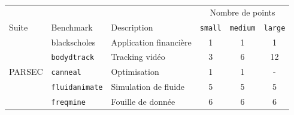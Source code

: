 \newcommand{\nothing}{-}
\begin{table}[h!]
\renewcommand{\arraystretch}{1.3}
	\begin{tabular}{l l l c c c}
\toprule
& & & \multicolumn{3}{c}{Nombre de points} \\
Suite & Benchmark & Description & \texttt{small} & \texttt{medium} & \texttt{large} \\
\midrule
\multirow{7}{*}{\textsc{PARSEC}} & blackscholes & Application financière & 1 & 1 & 1 \\
& \texttt{bodydtrack} & Tracking vidéo & 3 & 6 & 12 \\
& \texttt{canneal} & Optimisation & 1 & 1 & \nothing \\
& \texttt{fluidanimate} & Simulation de fluide & 5 & 5 & 5 \\
& \texttt{freqmine} & Fouille de donnée & 6 & 6 & 6 \\

\end{tabular}
\end{table}
